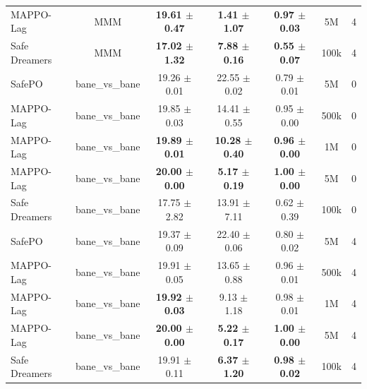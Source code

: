 \begin{longtable}{lcccccc}
MAPPO-Lag & MMM & \textbf{19.61 $\pm$ 0.47} & \textbf{1.41 $\pm$ 1.07} & \textbf{0.97 $\pm$ 0.03} & 5M & 4 \\
Safe Dreamers & MMM & \textbf{17.02 $\pm$ 1.32} & \textbf{7.88 $\pm$ 0.16} & \textbf{0.55 $\pm$ 0.07} & 100k & 4 \\
\midrule
SafePO & bane\_vs\_bane & 19.26 $\pm$ 0.01 & 22.55 $\pm$ 0.02 & 0.79 $\pm$ 0.01 & 5M & 0 \\
MAPPO-Lag & bane\_vs\_bane & 19.85 $\pm$ 0.03 & 14.41 $\pm$ 0.55 & 0.95 $\pm$ 0.00 & 500k & 0 \\
MAPPO-Lag & bane\_vs\_bane & \textbf{19.89 $\pm$ 0.01} & \textbf{10.28 $\pm$ 0.40} & \textbf{0.96 $\pm$ 0.00} & 1M & 0 \\
MAPPO-Lag & bane\_vs\_bane & \textbf{20.00 $\pm$ 0.00} & \textbf{5.17 $\pm$ 0.19} & \textbf{1.00 $\pm$ 0.00} & 5M & 0 \\
Safe Dreamers & bane\_vs\_bane & 17.75 $\pm$ 2.82 & 13.91 $\pm$ 7.11 & 0.62 $\pm$ 0.39 & 100k & 0 \\
\midrule
SafePO & bane\_vs\_bane & 19.37 $\pm$ 0.09 & 22.40 $\pm$ 0.06 & 0.80 $\pm$ 0.02 & 5M & 4 \\
MAPPO-Lag & bane\_vs\_bane & 19.91 $\pm$ 0.05 & 13.65 $\pm$ 0.88 & 0.96 $\pm$ 0.01 & 500k & 4 \\
MAPPO-Lag & bane\_vs\_bane & \textbf{19.92 $\pm$ 0.03} & 9.13 $\pm$ 1.18 & 0.98 $\pm$ 0.01 & 1M & 4 \\
MAPPO-Lag & bane\_vs\_bane & \textbf{20.00 $\pm$ 0.00} & \textbf{5.22 $\pm$ 0.17} & \textbf{1.00 $\pm$ 0.00} & 5M & 4 \\
Safe Dreamers & bane\_vs\_bane & 19.91 $\pm$ 0.11 & \textbf{6.37 $\pm$ 1.20} & \textbf{0.98 $\pm$ 0.02} & 100k & 4 \\
\end{longtable}
